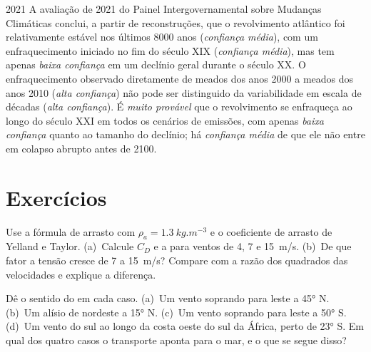 \begin{dated}{2021}
A avaliação de 2021 do Painel Intergovernamental sobre Mudanças Climáticas conclui, a partir de
reconstruções, que o revolvimento atlântico foi relativamente estável nos últimos
\num{8000} anos (\emph{confiança média}), com um enfraquecimento iniciado no fim do
século XIX (\emph{confiança média}), mas tem apenas \emph{baixa confiança} em um
declínio geral durante o século XX. O enfraquecimento observado diretamente de meados dos
anos 2000 a meados dos anos 2010 (\emph{alta confiança}) não pode ser distinguido da
variabilidade em escala de décadas (\emph{alta confiança}). É \emph{muito
provável} que o revolvimento se enfraqueça ao longo do século XXI em todos os cenários de emissões, com apenas
\emph{baixa confiança} quanto ao tamanho do declínio; há \emph{confiança média}
de que ele não entre em colapso abrupto antes de 2100.
\end{dated}

\section{Exercícios}

\begin{exercise}[$\star$]\label{exo:b1:ocean-circulation:1}
Use a fórmula de arrasto com $\rho_a = \qty{1.3}{kg.m^{-3}}$ e o coeficiente de arrasto
de Yelland e Taylor. (a)~Calcule $C_D$ e a  para ventos de 4, 7 e
\qty{15}{m/s}. (b)~De que fator a tensão cresce de 7 a \qty{15}{m/s}?
Compare com a razão dos quadrados das velocidades e explique a diferença.
\end{exercise}

\begin{exercise}[$\star$]\label{exo:b1:ocean-circulation:2}
Dê o sentido do  em cada caso. (a)~Um vento soprando para leste a
\ang{45} N. (b)~Um alísio de nordeste a \ang{15} N.
(c)~Um vento soprando para leste a \ang{50} S. (d)~Um vento do sul ao longo da
costa oeste do sul da África, perto de \ang{23} S. Em qual dos quatro casos o
transporte aponta para o mar, e o que se segue disso?
\end{exercise}

